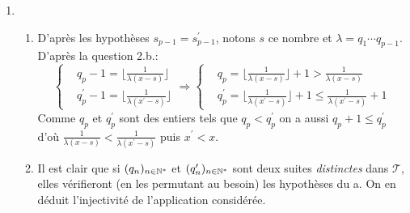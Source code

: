 \begin{enumerate}
\begin{enumerate}
D'autre part, $\frac{1}{q_1}< s_2 \leq x$, donc $\frac{1}{q_1} < x$ puis $\frac{1}{x}<q_1$. Cela entra{\^\i}ne $q_{1}-1\leq \frac{1}{x}<q_{1}$ ce qui prouve bien que $q_{1}=\lfloor x \rfloor+1$.

Plus g{\'e}n{\'e}ralement, pour $k$ fix{\'e} et $n\geq k$:
\[
s_{n}-s_{k}=\frac{1}{q_{1}\cdots q_{k}}\left( \frac{1}{q_{k+1}}+\frac{1}{q_{k+1}q_{k+2}}+\cdots +\frac{1}{q_{k+1}\cdots q_{n}}\right)
\]
\[
q_{1}\cdots q_{k}(s_{n}-s_{k})=\frac{1}{q_{k+1}}+\frac{1}{q_{k+1}q_{k+2}}+\cdots +\frac{1}{q_{k+1}\cdots q_{n}}
\]
Posons
$$q_{1}^{\prime }=q_{k+1},\,q_{2}^{\prime }=q_{k+2},\,\ldots $$
La suite qui figure {\`a} droite de l'{\'e}galit{\'e} pr{\'e}c{\'e}dente est de m{\^e}me nature que les suites $s_{n}$. Notons $y$ sa limite, on a alors en passant {\`a} la limite,
\begin{displaymath}
q_{1}\cdots q_{k}(x-s_{k})=y \text{\hspace{6pt} et \hspace{6pt}} \lfloor \frac{1}{y}\rfloor=q_{1}^{\prime} -1=q_{k+1}-1  
\end{displaymath}

\end{enumerate}

\item \begin{enumerate} \item D'apr{\`e}s les hypoth{\`e}ses $s_{p-1}=s_{p-1}^{\prime }$, notons $s$ ce nombre et $\lambda =q_{1}\cdots q_{p-1}$. D'après la question 2.b.:
\begin{displaymath}
\left\lbrace 
\begin{aligned}
&q_{p}-1=\lfloor \frac{1}{\lambda (x-s)}\rfloor \\ &q_{p}^{\prime }-1=\lfloor \frac{1}{\lambda (x^{\prime }-s)}\rfloor  
\end{aligned}
\right. \Rightarrow
\left\lbrace 
\begin{aligned}
&q_{p}=\lfloor \frac{1}{\lambda (x-s)}\rfloor + 1>\frac{1}{\lambda (x-s)} \\
&q_{p}^{\prime }= \lfloor \frac{1}{\lambda (x^{\prime }-s)}\rfloor + 1\leq \frac{1}{\lambda (x^{\prime }-s)}+1  
\end{aligned}
\right. 
\end{displaymath}
Comme $q_{p}$ et $q_{p}^{\prime }$ sont des entiers tels que $q_{p}<q_{p}^{\prime }$ on a aussi $q_{p}+1\leq q_{p}^{\prime }$ d'o{\`u} $\frac{1}{\lambda (x-s)}<\frac{1}{\lambda (x^{\prime }-s)}$ puis $x^{\prime}<x$.

\item Il est clair que si $(q_{n})_{n\in \mathbb{N}^{*}}$ et $ (q_{n}^{\prime })_{n\in \mathbb{N}^{*}}$ sont deux suites \emph{distinctes} dans $\mathcal{T}$, elles v{\'e}rifieront (en les permutant au besoin) les hypoth{\`e}ses du a. On en d{\'e}duit l'injectivit{\'e} de l'application consid{\'e}r{\'e}e.


\end{enumerate}
\end{enumerate}
